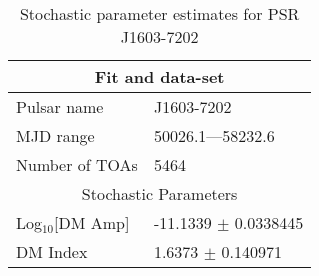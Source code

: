 \documentclass{article}
\begin{document}
\begin{table*}
\caption{Stochastic parameter estimates for PSR J1603-7202}
\begin{tabular}{ll}
\hline\hline
\multicolumn{2}{c}{Fit and data-set} \\ 
\hline
Pulsar name\dotfill & J1603-7202 \\ 
MJD range\dotfill & 50026.1---58232.6 \\ 
Number of TOAs\dotfill & 5464 \\
\hline
\multicolumn{2}{c}{Stochastic Parameters} \\ 
\hline
Log$_{10}$[DM Amp] \dotfill & -11.1339 $\pm$ 0.0338445  \\ 
DM Index \dotfill & 1.6373 $\pm$ 0.140971  \\ 
\hline
\end{tabular}
\label{Table:J1603-7202}
\end{table*} 
\end{document}
